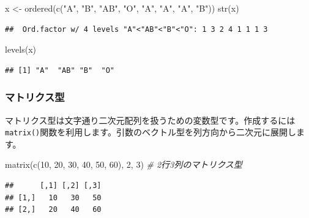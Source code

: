 \documentclass[
  12pt,
]{book}
\newenvironment{Shaded}{\begin{snugshade}}{\end{snugshade}}
\newcommand{\CommentTok}[1]{\textcolor[rgb]{0.56,0.35,0.01}{\textit{#1}}}
\newcommand{\DecValTok}[1]{\textcolor[rgb]{0.00,0.00,0.81}{#1}}
\newcommand{\FunctionTok}[1]{\textcolor[rgb]{0.00,0.00,0.00}{#1}}
\newcommand{\NormalTok}[1]{#1}
\newcommand{\OtherTok}[1]{\textcolor[rgb]{0.56,0.35,0.01}{#1}}
\newcommand{\StringTok}[1]{\textcolor[rgb]{0.31,0.60,0.02}{#1}}
\begin{document}
\begin{Shaded}
\begin{Highlighting}[numbers=left,,]
\NormalTok{x }\OtherTok{\textless{}{-}} \FunctionTok{ordered}\NormalTok{(}\FunctionTok{c}\NormalTok{(}\StringTok{"A"}\NormalTok{, }\StringTok{"B"}\NormalTok{, }\StringTok{"AB"}\NormalTok{, }\StringTok{"O"}\NormalTok{, }\StringTok{"A"}\NormalTok{, }\StringTok{"A"}\NormalTok{, }\StringTok{"A"}\NormalTok{, }\StringTok{"B"}\NormalTok{))}
\FunctionTok{str}\NormalTok{(x)}
\end{Highlighting}
\end{Shaded}

\begin{verbatim}
##  Ord.factor w/ 4 levels "A"<"AB"<"B"<"O": 1 3 2 4 1 1 1 3
\end{verbatim}

\begin{Shaded}
\begin{Highlighting}[numbers=left,,]
\FunctionTok{levels}\NormalTok{(x)}
\end{Highlighting}
\end{Shaded}

\begin{verbatim}
## [1] "A"  "AB" "B"  "O"
\end{verbatim}

\hypertarget{ux30deux30c8ux30eaux30afux30b9ux578b}{%
\subsubsection{マトリクス型}\label{ux30deux30c8ux30eaux30afux30b9ux578b}}

マトリクス型は文字通り二次元配列を扱うための変数型です。作成するには\texttt{matrix()}関数を利用します。引数のベクトル型を列方向から二次元に展開します。

\begin{Shaded}
\begin{Highlighting}[numbers=left,,]
\FunctionTok{matrix}\NormalTok{(}\FunctionTok{c}\NormalTok{(}\DecValTok{10}\NormalTok{, }\DecValTok{20}\NormalTok{, }\DecValTok{30}\NormalTok{, }\DecValTok{40}\NormalTok{, }\DecValTok{50}\NormalTok{, }\DecValTok{60}\NormalTok{), }\DecValTok{2}\NormalTok{, }\DecValTok{3}\NormalTok{)     }\CommentTok{\# 2行3列のマトリクス型}
\end{Highlighting}
\end{Shaded}

\begin{verbatim}
##      [,1] [,2] [,3]
## [1,]   10   30   50
## [2,]   20   40   60
\end{verbatim}
\end{document}
